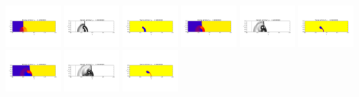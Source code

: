 \documentclass[11pt]{article}
\begin{document}
\includegraphics[width=0.15833333333333333\textwidth]{frame0002fig2.png}
\includegraphics[width=0.15833333333333333\textwidth]{frame0003fig0.png}
\includegraphics[width=0.15833333333333333\textwidth]{frame0003fig1.png}
\includegraphics[width=0.15833333333333333\textwidth]{frame0003fig2.png}
\vskip 10pt 
\includegraphics[width=0.15833333333333333\textwidth]{frame0004fig0.png}
\includegraphics[width=0.15833333333333333\textwidth]{frame0004fig1.png}
\includegraphics[width=0.15833333333333333\textwidth]{frame0004fig2.png}
\includegraphics[width=0.15833333333333333\textwidth]{frame0005fig0.png}
\includegraphics[width=0.15833333333333333\textwidth]{frame0005fig1.png}
\end{document}
